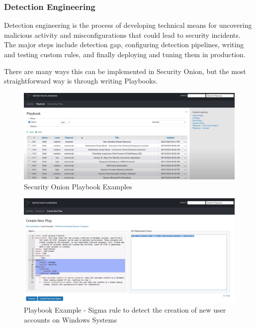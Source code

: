 \subsubsection{Detection Engineering}
Detection engineering is the process of developing technical means for uncovering malicious activity and misconfigurations that could lead to security incidents.
The major steps include detection gap, configuring detection pipelines, writing and testing custom rules, and finally deploying and tuning them in production.

There are many ways this can be implemented in Security Onion, but the most straightforward way is through writing Playbooks.

\begin{figure}[H]
    \centering
    \includegraphics[width=1\textwidth]{src/assets/images/security-onion-playbooks.png}
    \caption{Security Onion Playbook Examples}
\end{figure}

\begin{figure}[H]
    \centering
    \includegraphics[width=1\textwidth]{src/assets/images/security-onion-sigma-rule.png}
    \caption{Playbook Example - Sigma rule to detect the creation of new user accounts on Windows Systems}
\end{figure}

